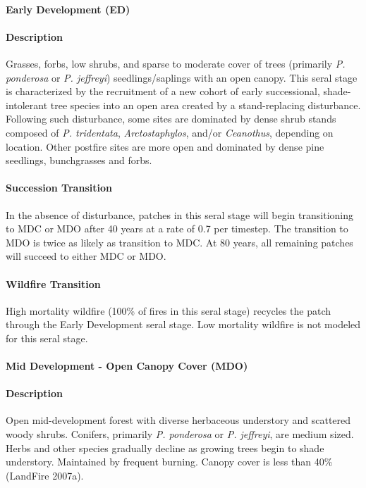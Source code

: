 \paragraph*{Early Development (ED)}

\paragraph*{Description} Grasses, forbs, low shrubs, and sparse to moderate cover of trees (primarily \emph{P. ponderosa} or \emph{P. jeffreyi}) seedlings/saplings with an open canopy. This seral stage is characterized by the recruitment of a new cohort of early successional, shade-intolerant tree species into an open area created by a stand-replacing disturbance. Following such disturbance, some sites are dominated by dense shrub stands composed of \emph{P. tridentata}, \emph{Arctostaphylos}, and/or \emph{Ceanothus}, depending on location. Other postfire sites are more open and dominated by dense pine seedlings, bunchgrasses and forbs.

\paragraph*{Succession Transition} In the absence of disturbance, patches in this seral stage will begin transitioning to MDC or MDO after 40 years at a rate of 0.7 per timestep. The transition to MDO is twice as likely as transition to MDC.  At 80 years, all remaining patches will succeed to either MDC or MDO. 

\paragraph*{Wildfire Transition} High mortality wildfire (100\% of fires in this seral stage) recycles the patch through the Early Development seral stage. Low mortality wildfire is not modeled for this seral stage. 

\noindent\hrulefill


\paragraph*{Mid Development - Open Canopy Cover (MDO)}

\paragraph*{Description} Open mid-development forest with diverse herbaceous understory and scattered woody shrubs. Conifers, primarily \emph{P. ponderosa} or \emph{P. jeffreyi}, are medium sized. Herbs and other species gradually decline as growing trees begin to shade understory. Maintained by frequent burning. Canopy cover is less than 40\% (LandFire 2007a). 

